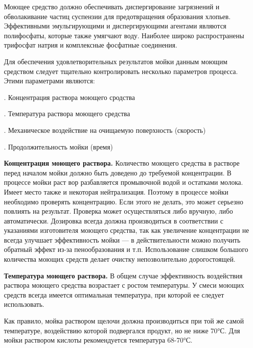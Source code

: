 {\par \redline Моющее средство должно обеспечивать диспергирование загрязнений и обволакивание частиц суспензии для предотвращения образования хлопьев. Эффективными эмульгирующими и диспергирующими агентами являются полифосфаты, которые также умягчают воду. Наиболее широко распространены трифосфат натрия и комплексные фосфатные соединения.

\par \redline Для обеспечения удовлетворительных результатов мойки данным моющим средством следует тщательно контролировать несколько параметров процесса. Этими параметрами являются:

\par {}. Концентрация раствора моющего сродства
\par {}. Температура раствора моющего средства
\par {}. Механическое воздействие на очищаемую поверхность (скорость)
\par {}. Продолжительность мойки (время)


\par \redline \textbf{Концентрация моющего раствора.} Количество моющего средства в растворе перед началом мойки должно быть доведено до требуемой концентрации. В процессе мойки раст вор разбавляется промывочной водой и остатками молока. Имеет место также и некоторая нейтрализация. Поэтому в процессе мойки необходимо проверять концентрацию. Если этого не делать, это может серьезно повлиять на результат. Проверка может осуществляться либо вручную, либо автоматически. Дозировка всегда должна производиться в соответствии с указаниями изготовителя моющего средства, так как увеличение концентрации не всегда улучшает эффективность мойки — в действительности можно получить обратный эффект из-за пенообразования и т.п. Использование слишком большого количества моющих средств делает очистку непозволительно дорогостоящей.

\par \redline \textbf{Температура моющего раствора.} В общем случае эффективность воздействия раствора моющего средства возрастает с ростом температуры. У смеси моющих средств всегда имеется оптимальная температура, при которой ее следует использовать.

\par \redline Как правило, мойка раствором щелочи должна производиться при той же самой температуре, воздействию которой подвергался продукт, но не ниже 70°С. Для мойки раствором кислоты рекомендуется температура 68-70°С.

}
